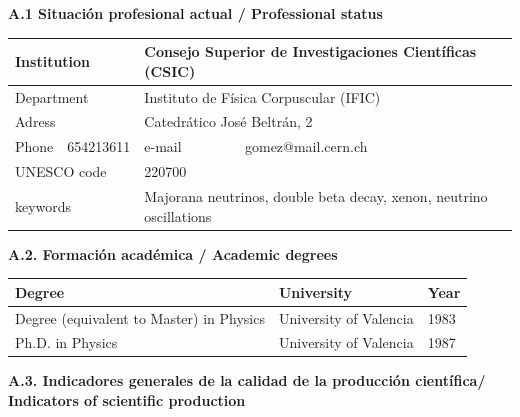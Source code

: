 \documentclass[a4paper,11pt,oneside]{article}
\begin{document}
 \noindent\textbf{A.1 Situación profesional actual / Professional status}
\begin{table}[h!]
\begin{flushleft}
\begin{tabular}{| l | l | l | l |}
\hline
\multicolumn{2}{|l|}{Institution} & \multicolumn{2}{|l|}{ Consejo Superior de Investigaciones Científicas  (CSIC)}\\
\hline
\multicolumn{2}{|l|}{Department} & \multicolumn{2}{|l|}{ Instituto de Física Corpuscular (IFIC) }\\
\hline
\multicolumn{2}{|l|}{Adress} & \multicolumn{2}{|l|}{ Catedrático José Beltrán, 2  }\\
\hline
Phone & 654213611 & e-mail & gomez@mail.cern.ch\\
\hline
\multicolumn{2}{|l|}{UNESCO code} & \multicolumn{2}{|l|}{ 220700  }\\
\hline
\multicolumn{2}{|l|}{keywords} & \multicolumn{2}{|l|}{ Majorana neutrinos, double beta decay, xenon, neutrino oscillations}\\
\hline
\end{tabular}
\label{tab:profesional}
\end{flushleft}
\end{table} 

\noindent\textbf{A.2. Formación académica / Academic degrees}
\begin{table}[h!]
\begin{flushleft}
\begin{tabular}{| l | l | l | }
\hline
Degree & University & Year\\
\hline
Degree (equivalent to Master) in Physics & University of Valencia & 1983 \\
Ph.D. in Physics & University of Valencia & 1987 \\
\hline
\end{tabular}
\label{tab:academic}
\end{flushleft}
\end{table} 

\noindent\textbf{A.3. Indicadores generales de la calidad de la producción científica/ Indicators of scientific production}
\end{document}

